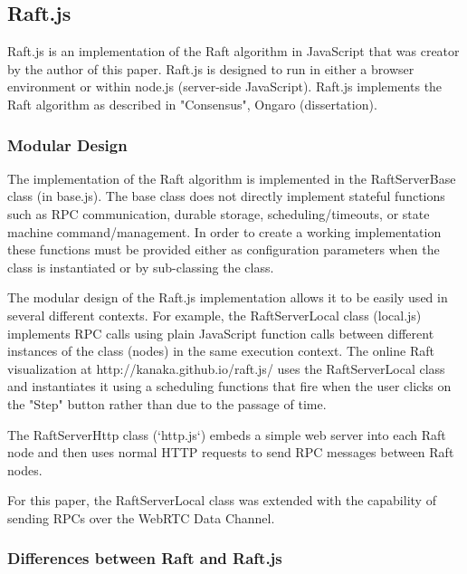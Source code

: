 \documentclass[9pt]{extarticle}
\begin{document}
\begin{multicols}{2}
\subsection{Raft.js}

Raft.js is an implementation of the Raft algorithm in JavaScript that
was creator by the author of this paper. %
Raft.js is designed to run in either a browser environment or within
node.js (server-side JavaScript). Raft.js implements the Raft
algorithm as described in "Consensus", Ongaro (dissertation).

\subsubsection{Modular Design}

The implementation of the Raft algorithm is implemented in the
RaftServerBase class (in base.js). The base class does not directly
implement stateful functions such as RPC communication, durable
storage, scheduling/timeouts, or state machine command/management. In
order to create a working implementation these functions must be
provided either as configuration parameters when the class is
instantiated or by sub-classing the class.

The modular design of the Raft.js implementation allows it to be easily
used in several different contexts. For example, the RaftServerLocal
class (local.js) implements RPC calls using plain JavaScript function
calls between different instances of the class (nodes) in the same
execution context. The online Raft visualization at
http://kanaka.github.io/raft.js/ uses the RaftServerLocal class and
instantiates it using a scheduling functions that fire when the user
clicks on the "Step" button rather than due to the passage of time.

The RaftServerHttp class (`http.js`) embeds a simple web server into
each Raft node and then uses normal HTTP requests to send RPC messages
between Raft nodes.

For this paper, the RaftServerLocal class was extended with the
capability of sending RPCs over the WebRTC Data Channel.

\subsubsection{Differences between Raft and Raft.js}


\end{multicols}
\end{document}
